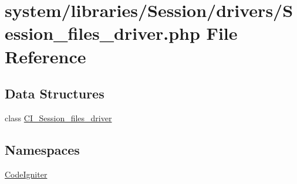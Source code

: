 \hypertarget{_session__files__driver_8php}{}\section{system/libraries/\+Session/drivers/\+Session\+\_\+files\+\_\+driver.php File Reference}
\label{_session__files__driver_8php}
\subsection*{Data Structures}
\begin{DoxyCompactItemize}
\item 
class \mbox{\hyperlink{class_c_i___session__files__driver}{C\+I\+\_\+\+Session\+\_\+files\+\_\+driver}}
\end{DoxyCompactItemize}
\subsection*{Namespaces}
\begin{DoxyCompactItemize}
\item 
 \mbox{\hyperlink{namespace_code_igniter}{Code\+Igniter}}
\end{DoxyCompactItemize}
